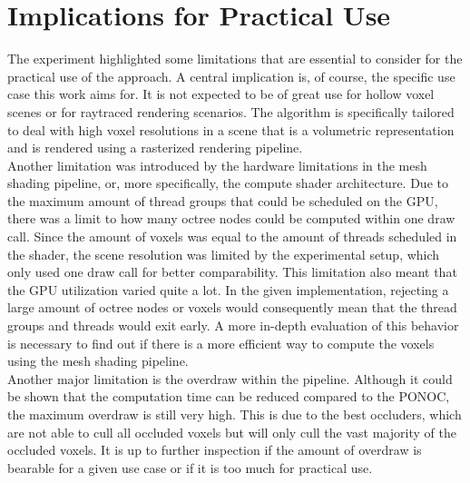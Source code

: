 \section{Implications for Practical Use}

The experiment highlighted some limitations that are essential to consider for the practical use of the approach. 
A central implication is, of course, the specific use case this work aims for. It is not expected to be of great use 
for hollow voxel scenes or for raytraced rendering scenarios. The algorithm is specifically tailored to deal with 
high voxel resolutions in a scene that is a volumetric representation and is rendered using a rasterized rendering 
pipeline. \\

\noindent
Another limitation was introduced by the hardware limitations in the mesh shading pipeline, or, more specifically, the 
compute shader architecture. Due to the maximum amount of thread groups that could be scheduled on the \ac{GPU}, there 
was a limit to how many octree nodes could be computed within one draw call. Since the amount of voxels was equal to the 
amount of threads scheduled in the shader, the scene resolution was limited by the experimental setup, which only used 
one draw call for better comparability. This limitation also meant that the \ac{GPU} utilization varied quite a lot. 
In the given implementation, rejecting a large amount of octree nodes or voxels would consequently mean that the thread 
groups and threads would exit early. A more in-depth evaluation of this behavior is necessary to find out if there is a 
more efficient way to compute the voxels using the mesh shading pipeline. \\

\noindent
Another major limitation is the overdraw within the pipeline. Although it could be shown that the computation time 
can be reduced compared to the \ac{PONOC}, the maximum overdraw is still very high. This is due to the best occluders, 
which are not able to cull all occluded voxels but will only cull the vast majority of the occluded voxels. It is up 
to further inspection if the amount of overdraw is bearable for a given use case or if it is too much for practical 
use. \\
\enlargethispage{\baselineskip}

